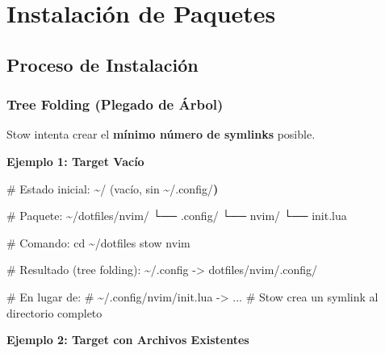 \documentclass[
  doc,
  floatsintext,
  longtable,
  a4paper,
  nolmodern,
  notxfonts,
  notimes,
  12pt,
  colorlinks=true,linkcolor=blue,citecolor=blue,urlcolor=blue]{apa7}
\newenvironment{Shaded}{\begin{snugshade}}{\end{snugshade}}
\newcommand{\AttributeTok}[1]{\textcolor[rgb]{0.40,0.45,0.13}{#1}}
\newcommand{\BuiltInTok}[1]{\textcolor[rgb]{0.00,0.23,0.31}{#1}}
\newcommand{\CommentTok}[1]{\textcolor[rgb]{0.37,0.37,0.37}{#1}}
\newcommand{\ErrorTok}[1]{\textcolor[rgb]{0.68,0.00,0.00}{#1}}
\newcommand{\ExtensionTok}[1]{\textcolor[rgb]{0.00,0.23,0.31}{#1}}
\newcommand{\KeywordTok}[1]{\textcolor[rgb]{0.00,0.23,0.31}{\textbf{#1}}}
\newcommand{\NormalTok}[1]{\textcolor[rgb]{0.00,0.23,0.31}{#1}}
\newcommand{\OperatorTok}[1]{\textcolor[rgb]{0.37,0.37,0.37}{#1}}
\begin{document}
\section{Instalación de Paquetes}\label{instalaciuxf3n-de-paquetes}

\subsection{Proceso de Instalación}\label{proceso-de-instalaciuxf3n}

\subsubsection{Tree Folding (Plegado de
Árbol)}\label{tree-folding-plegado-de-uxe1rbol}

Stow intenta crear el \textbf{mínimo número de symlinks} posible.

\textbf{Ejemplo 1: Target Vacío}

\begin{Shaded}
\begin{Highlighting}[]
\CommentTok{\# Estado inicial:}
\ExtensionTok{\textasciitilde{}/} \ErrorTok{(}\ExtensionTok{vacío,}\NormalTok{ sin \textasciitilde{}/.config/}\KeywordTok{)}

\CommentTok{\# Paquete:}
\ExtensionTok{\textasciitilde{}/dotfiles/nvim/}
  \ExtensionTok{└──}\NormalTok{ .config/}
      \ExtensionTok{└──}\NormalTok{ nvim/}
          \ExtensionTok{└──}\NormalTok{ init.lua}

\CommentTok{\# Comando:}
\BuiltInTok{cd}\NormalTok{ \textasciitilde{}/dotfiles}
\ExtensionTok{stow}\NormalTok{ nvim}

\CommentTok{\# Resultado (tree folding):}
\ExtensionTok{\textasciitilde{}/.config} \AttributeTok{{-}}\OperatorTok{\textgreater{}}\NormalTok{ dotfiles/nvim/.config/}

\CommentTok{\# En lugar de:}
\CommentTok{\# \textasciitilde{}/.config/nvim/init.lua {-}\textgreater{} ...}
\CommentTok{\# Stow crea un symlink al directorio completo}
\end{Highlighting}
\end{Shaded}

\textbf{Ejemplo 2: Target con Archivos Existentes}
\end{document}
